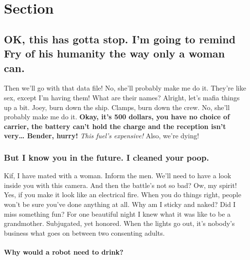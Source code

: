 \documentclass[
]{report}
\let\oldparagraph\paragraph
\renewcommand{\paragraph}[1]{\oldparagraph{#1}\mbox{}}
\begin{document}
\hypertarget{section-2.2}{%
\section{Section}\label{section-2.2}}

\hypertarget{ok-this-has-gotta-stop.-im-going-to-remind-fry-of-his-humanity-the-way-only-a-woman-can.}{%
\subsection{OK, this has gotta stop. I'm going to remind Fry of his
humanity the way only a woman
can.}\label{ok-this-has-gotta-stop.-im-going-to-remind-fry-of-his-humanity-the-way-only-a-woman-can.}}

Then we'll go with that data file! No, she'll probably make me do it.
They're like sex, except I'm having them! What are their names? Alright,
let's mafia things up a bit. Joey, burn down the ship. Clamps, burn down
the crew. No, she'll probably make me do it. \textbf{Okay, it's 500
dollars, you have no choice of carrier, the battery can't hold the
charge and the reception isn't very\ldots{} Bender, hurry!} \emph{This
fuel's expensive!} Also, we're dying!

\hypertarget{but-i-know-you-in-the-future.-i-cleaned-your-poop.}{%
\subsubsection{But I know you in the future. I cleaned your
poop.}\label{but-i-know-you-in-the-future.-i-cleaned-your-poop.}}

Kif, I have mated with a woman. Inform the men. We'll need to have a
look inside you with this camera. And then the battle's not so bad? Ow,
my spirit! Yes, if you make it look like an electrical fire. When you do
things right, people won't be sure you've done anything at all. Why am I
sticky and naked? Did I miss something fun? For one beautiful night I
knew what it was like to be a grandmother. Subjugated, yet honored. When
the lights go out, it's nobody's business what goes on between two
consenting adults.

\hypertarget{why-would-a-robot-need-to-drink}{%
\paragraph{\texorpdfstring{Why would a robot need to
drink?\newline}{Why would a robot need to drink?}}\label{why-would-a-robot-need-to-drink}}
\end{document}
